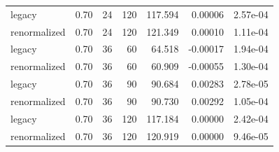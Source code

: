 \begin{longtable}{llrrrrr}
legacy & 0.70 & 24 & 120 & 117.594 & 0.00006 & 2.57e-04 \\
renormalized & 0.70 & 24 & 120 & 121.349 & 0.00010 & 1.11e-04 \\
legacy & 0.70 & 36 & 60 & 64.518 & -0.00017 & 1.94e-04 \\
renormalized & 0.70 & 36 & 60 & 60.909 & -0.00055 & 1.30e-04 \\
legacy & 0.70 & 36 & 90 & 90.684 & 0.00283 & 2.78e-05 \\
renormalized & 0.70 & 36 & 90 & 90.730 & 0.00292 & 1.05e-04 \\
legacy & 0.70 & 36 & 120 & 117.184 & 0.00000 & 2.42e-04 \\
renormalized & 0.70 & 36 & 120 & 120.919 & 0.00000 & 9.46e-05 \\
\bottomrule
\end{longtable}
